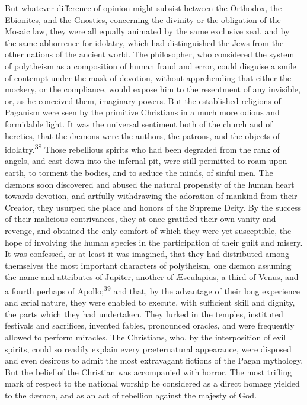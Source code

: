 But whatever difference of opinion might subsist between the
Orthodox, the Ebionites, and the Gnostics, concerning the
divinity or the obligation of the Mosaic law, they were all
equally animated by the same exclusive zeal, and by the same
abhorrence for idolatry, which had distinguished the Jews from
the other nations of the ancient world. The philosopher, who
considered the system of polytheism as a composition of human
fraud and error, could disguise a smile of contempt under the
mask of devotion, without apprehending that either the mockery,
or the compliance, would expose him to the resentment of any
invisible, or, as he conceived them, imaginary powers. But the
established religions of Paganism were seen by the primitive
Christians in a much more odious and formidable light. It was the
universal sentiment both of the church and of heretics, that the
dæmons were the authors, the patrons, and the objects of
idolatry.\textsuperscript{38} Those rebellious spirits who had been degraded from
the rank of angels, and cast down into the infernal pit, were
still permitted to roam upon earth, to torment the bodies, and to
seduce the minds, of sinful men. The dæmons soon discovered and
abused the natural propensity of the human heart towards
devotion, and artfully withdrawing the adoration of mankind from
their Creator, they usurped the place and honors of the Supreme
Deity. By the success of their malicious contrivances, they at
once gratified their own vanity and revenge, and obtained the
only comfort of which they were yet susceptible, the hope of
involving the human species in the participation of their guilt
and misery. It was confessed, or at least it was imagined, that
they had distributed among themselves the most important
characters of polytheism, one dæmon assuming the name and
attributes of Jupiter, another of Æsculapius, a third of Venus,
and a fourth perhaps of Apollo;\textsuperscript{39} and that, by the advantage of
their long experience and ærial nature, they were enabled to
execute, with sufficient skill and dignity, the parts which they
had undertaken. They lurked in the temples, instituted festivals
and sacrifices, invented fables, pronounced oracles, and were
frequently allowed to perform miracles. The Christians, who, by
the interposition of evil spirits, could so readily explain every
præternatural appearance, were disposed and even desirous to
admit the most extravagant fictions of the Pagan mythology. But
the belief of the Christian was accompanied with horror. The most
trifling mark of respect to the national worship he considered as
a direct homage yielded to the dæmon, and as an act of rebellion
against the majesty of God.

